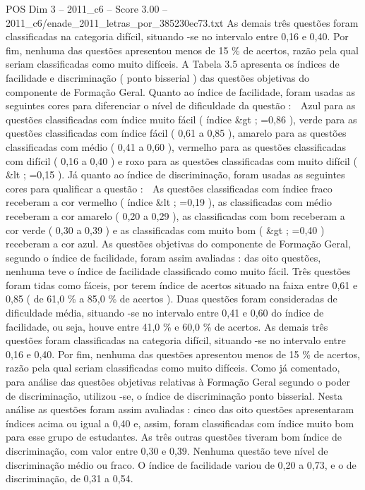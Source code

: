 \begin{textsample}{POS Dim 3 – 2011\_c6 – Score 3.00 – 2011\_c6/enade\_2011\_letras\_por\_385230ec73.txt}
As demais três questões foram classificadas na categoria difícil, situando -se no intervalo entre 0,16 e 0,40.
Por fim, nenhuma das questões apresentou menos de 15 \% de acertos, razão pela qual seriam classificadas como muito difíceis.
A Tabela 3.5 apresenta os índices de facilidade e discriminação ( ponto bisserial ) das questões objetivas do componente de Formação Geral.
Quanto ao índice de facilidade, foram usadas as seguintes cores para diferenciar o nível de dificuldade da questão :  Azul para as questões classificadas com índice muito fácil ( índice \&gt ; =0,86 ), verde para as questões classificadas com índice fácil ( 0,61 a 0,85 ), amarelo para as questões classificadas com médio ( 0,41 a 0,60 ), vermelho para as questões classificadas com difícil ( 0,16 a 0,40 ) e roxo para as questões classificadas com muito difícil ( \&lt ; =0,15 ).
Já quanto ao índice de discriminação, foram usadas as seguintes cores para qualificar a questão :  As questões classificadas com índice fraco receberam a cor vermelho ( índice \&lt ; =0,19 ), as classificadas com médio receberam a cor amarelo ( 0,20 a 0,29 ), as classificadas com bom receberam a cor verde ( 0,30 a 0,39 ) e as classificadas com muito bom ( \&gt ; =0,40 ) receberam a cor azul.
As questões objetivas do componente de Formação Geral, segundo o índice de facilidade, foram assim avaliadas : das oito questões, nenhuma teve o índice de facilidade classificado como muito fácil.
Três questões foram tidas como fáceis, por terem índice de acertos situado na faixa entre 0,61 e 0,85 ( de 61,0 \% a 85,0 \% de acertos ).
Duas questões foram consideradas de dificuldade média, situando -se no intervalo entre 0,41 e 0,60 do índice de facilidade, ou seja, houve entre 41,0 \% e 60,0 \% de acertos.
As demais três questões foram classificadas na categoria difícil, situando -se no intervalo entre 0,16 e 0,40.
Por fim, nenhuma das questões apresentou menos de 15 \% de acertos, razão pela qual seriam classificadas como muito difíceis.
Como já comentado, para análise das questões objetivas relativas à Formação Geral segundo o poder de discriminação, utilizou -se, o índice de discriminação ponto bisserial.
Nesta análise as questões foram assim avaliadas : cinco das oito questões apresentaram índices acima ou igual a 0,40 e, assim, foram classificadas com índice muito bom para esse grupo de estudantes.
As três outras questões tiveram bom índice de discriminação, com valor entre 0,30 e 0,39.
Nenhuma questão teve nível de discriminação médio ou fraco.
O índice de facilidade variou de 0,20 a 0,73, e o de discriminação, de 0,31 a 0,54.

\end{textsample}
